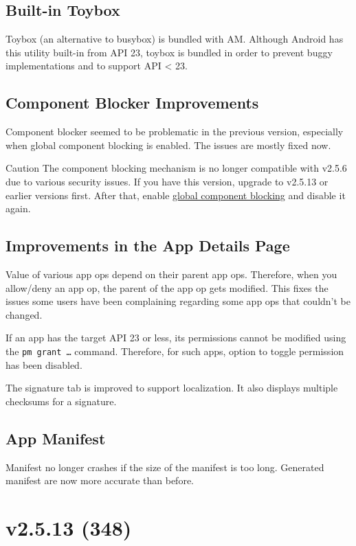 \subsection{Built-in Toybox}
Toybox (an alternative to busybox) is bundled with AM. Although Android has this utility built-in from API 23, toybox
is bundled in order to prevent buggy implementations and to support API < 23.

\subsection{Component Blocker Improvements}
Component blocker seemed to be problematic in the previous version, especially when global component blocking is enabled.
The issues are mostly fixed now.

\begin{warning}{Caution}
    The component blocking mechanism is no longer compatible with v2.5.6 due to various security issues. If you have
    this version, upgrade to v2.5.13 or earlier versions first. After that, enable
    \hyperref[subsubsec:instant-component-blocking]{global component blocking} and disable it again.
\end{warning}

\subsection{Improvements in the App Details Page}
Value of various app ops depend on their parent app ops. Therefore, when you allow/deny an app op, the parent of the app
op gets modified. This fixes the issues some users have been complaining regarding some app ops that couldn't be changed.

If an app has the target API 23 or less, its permissions cannot be modified using the \texttt{pm grant \ldots} command.
Therefore, for such apps, option to toggle permission has been disabled.

The signature tab is improved to support localization. It also displays multiple checksums for a signature.

\subsection{App Manifest}
Manifest no longer crashes if the size of the manifest is too long. Generated manifest are now more accurate than before.


\section{v2.5.13 (348)}

